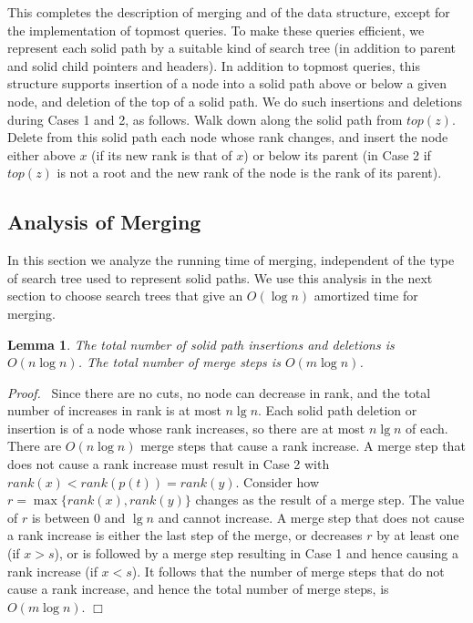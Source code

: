 \documentclass[twoside,leqno,twocolumn]{article}
\newtheorem{lemma}{Lemma}
\newcommand{\proof}{\noindent \emph{Proof.}\ }
\newcommand{\proofend}{$\Box$\\}
\newcommand{\rank}{\mathit{rank}}
\newcommand{\topn}{\mathit{top}}
\begin{document}
This completes the description of merging and of the data structure, except for the implementation of topmost queries.  To make these queries efficient, we represent each solid path by a suitable kind of search tree (in addition to parent and solid child pointers and headers).  In addition to topmost queries, this structure supports insertion of a node into a solid path above or below a given node, and deletion of the top of a solid path.  We do such insertions and deletions during Cases 1 and 2, as follows.  Walk down along the solid path from $\topn(z)$.  Delete from this solid path each node whose rank changes, and insert the node either above $x$ (if its new rank is that of $x$) or below its parent (in Case 2 if $\topn(z)$ is not a root and the new rank of the node is the rank of its parent).




\subsection{Analysis of Merging}
\label{sec:merge-analysis}

In this section we analyze the running time of merging, independent of the type of search tree used to represent solid paths.  We use this analysis in the next section to choose search trees that give an $O(\log n)$ amortized time for merging.

\begin{lemma}
\label{lemma:number-of-steps} The total number of solid path insertions and deletions is $O(n \log n)$.  The total number of merge steps is $O(m \log n)$.
\end{lemma}
\proof
Since there are no cuts, no node can decrease in rank, and the total number of increases in rank is at most $n \lg n$.  Each solid path deletion or insertion is of a node whose rank increases, so there are at most $n \lg n$ of each.  There are $O(n \log n)$ merge steps that cause a rank increase.  A merge step that does not cause a rank increase must result in Case 2 with $\rank(x) < \rank(p(t)) = \rank(y)$.  Consider how $r = \max \{ \rank(x), \rank(y) \}$ changes as the result of a merge step.  The value of $r$ is between 0 and $\lg n$ and cannot increase.  A merge step that does not cause a rank increase is either the last step of the merge, or decreases $r$ by at least one (if $x > s$), or is followed by a merge step resulting in Case 1 and hence causing a rank increase (if $x < s$).  It follows that the number of merge steps that do not cause a rank increase, and hence the total number of merge steps, is $O(m \log n)$. \proofend
\end{document}
